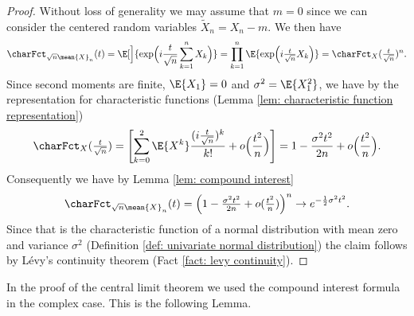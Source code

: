 \begin{proof}
    Without loss of generality we may assume that \(m=0\) since we can
    consider the centered random variables \(\tilde{X}_n = X_n - m\).
    We then have
    \[
        \charFct_{\sqrt{n} \mean{X}_n}(t)
        = \E[\Big]{\exp\Bigl(i \frac{t}{\sqrt{n}} \sum_{k=1}^n X_k\Bigr)}
        = \prod_{k=1}^n \E{\exp\Bigl(i \tfrac{t}{\sqrt{n}} X_k\Bigr)}
        = \charFct_{X}(\tfrac{t}{\sqrt{n}})^n.
    \]
    Since second moments are finite, \(\E{X_1} = 0\) and \(\sigma^2 =
    \E{X_1^2}\), we have by the representation for characteristic functions
    (Lemma \ref{lem: characteristic function representation})
    \[
        \charFct_X(\tfrac{t}{\sqrt{n}})
        = \Biggl[\sum_{k=0}^2 \E{X^k}\frac{(i\frac{t}{\sqrt{n}})^k}{k!} + o\Bigl(\frac{t^2}{n}\Bigr)\Biggr]
        = 1 - \frac{\sigma^2 t^2}{2 n} + o\Bigl(\frac{t^2}{n}\Bigr).
    \]
    Consequently we have by Lemma \ref{lem: compound interest}
    \[
        \charFct_{\sqrt{n} \mean{X}_n}(t)
        = \Bigl(1 - \tfrac{\sigma^2 t^2}{2 n} + o(\tfrac{t^2}{n})\Bigr)^n
        \to e^{-\frac12 \sigma^2 t^2}.
    \]
    Since that is the characteristic function of a normal distribution
    with mean zero and variance \(\sigma^2\) (Definition \ref{def: univariate
    normal distribution}) the claim follows by Lévy's continuity theorem (Fact \ref{fact: levy continuity}).
\end{proof}

In the proof of the central limit theorem we used the compound interest
formula in the complex case. This is the following Lemma.

